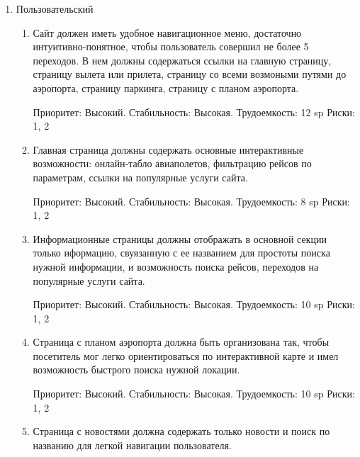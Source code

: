 
\begin{enumerate}
      \item Пользовательский
            \begin{enumerate}
                  \item Сайт должен иметь удобное навигационное меню,
                        достаточно интуитивно-понятное, чтобы пользователь совершил не более
                        5 переходов.
                        В нем должны содержаться ссылки на главную страницу, страницу вылета или прилета,
                        страницу со всеми возмоными путями до аэропорта,
                        страницу паркинга, страницу с планом аэропорта.

                        Приоритет: Высокий. Стабильность: Высокая. Трудоемкость: 12 sp
                        Риски: 1, 2

                  \item Главная страница должны содержать основные интерактивные возможности:
                        онлайн-табло авиаполетов, фильтрацию рейсов по параметрам,
                        ссылки на популярные услуги сайта.

                        Приоритет: Высокий. Стабильность: Высокая. Трудоемкость: 8 sp
                        Риски: 1, 2

                  \item Информационные страницы должны отображать в основной секции только иформацию,
                        свуязанную с ее названием для простоты поиска нужной информации,
                        и возможность поиска рейсов, переходов на популярные услуги сайта.

                        Приоритет: Высокий. Стабильность: Высокая. Трудоемкость: 10 sp
                        Риски: 1, 2

                  \item Страница с планом аэропорта должна быть организована так, чтобы
                        посетитель мог легко ориентироваться по интерактивной карте и имел возможность
                        быстрого поиска нужной локации.

                        Приоритет: Высокий. Стабильность: Высокая. Трудоемкость: 10 sp
                        Риски: 1, 2

                  \item Страница с новостями должна содержать только новости и
                        поиск по названию для легкой навигации пользователя.


\end{enumerate}
\end{enumerate}

